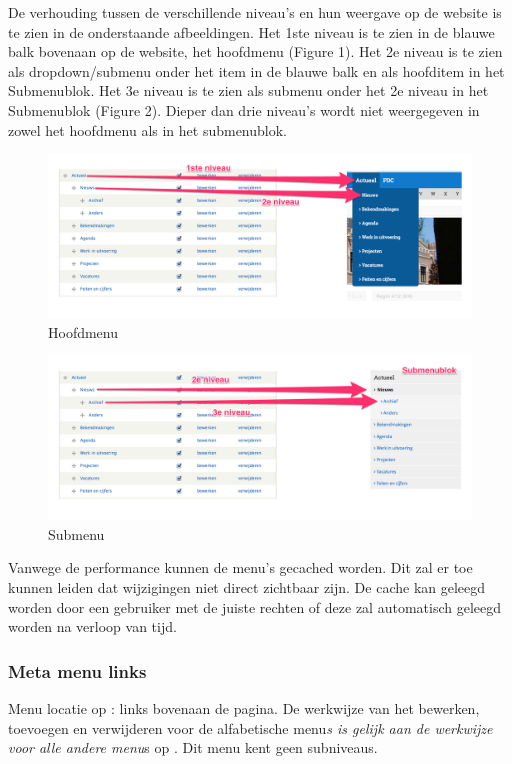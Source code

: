 De verhouding tussen de verschillende niveau's en hun weergave op de website is te zien in de onderstaande afbeeldingen. Het 1ste niveau is te zien in de blauwe balk bovenaan op de website, het hoofdmenu (Figure 1). Het 2e niveau is te zien als dropdown/submenu onder het item in de blauwe balk en als hoofditem in het Submenublok. Het 3e niveau is te zien als submenu onder het 2e niveau in het Submenublok (Figure 2). Dieper dan drie niveau's wordt niet weergegeven in zowel het hoofdmenu als in het submenublok.

\begin{figure}[h!]
  \includegraphics[width=\textwidth]{img/menu_mainmenu.png}
  \caption{Hoofdmenu}
\end{figure}

\begin{figure}[h!]
  \includegraphics[width=\textwidth]{img/menu_submenu.png}
  \caption{Submenu}
\end{figure}

\bigskip

Vanwege de performance kunnen de menu's gecached worden. Dit zal er toe kunnen leiden dat wijzigingen niet direct zichtbaar zijn. De cache kan geleegd worden door een gebruiker met de juiste rechten of deze zal automatisch geleegd worden na verloop van tijd.

\bigskip

\subsubsection{Meta menu links}\label{metamenulinks}
Menu locatie op \drupalpath{}: links bovenaan de pagina. De werkwijze van het bewerken, toevoegen en verwijderen voor de alfabetische menu\emph{s is gelijk aan de werkwijze voor alle andere menu}s op \drupalpath{}. Dit menu kent geen subniveaus.
\bigskip

